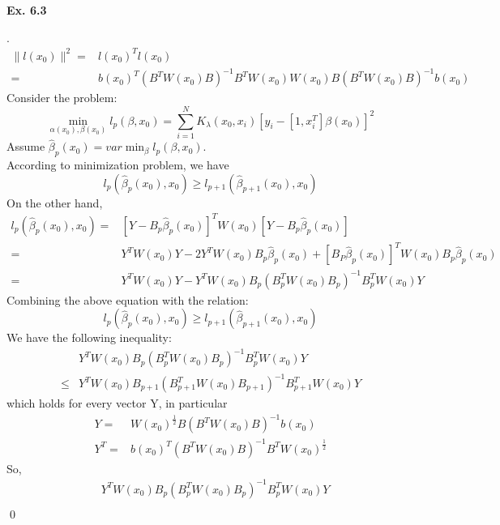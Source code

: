 \documentclass[12pt]{article}
\newenvironment{sol}
  {\par\vspace{3mm}\noindent{\it Solution}.}
  {\qed}
\begin{document}
\newpage
\begin{flushleft}
\textbf{Ex. 6.3}
\end{flushleft}
\begin{sol}
\begin{equation*}
\begin{split}
\parallel l(x_0)\parallel^2=&l(x_0)^Tl(x_0)\\
=&b(x_0)^T(B^TW(x_0)B)^{-1}B^TW(x_0)W(x_0)B(B^TW(x_0)B)^{-1}b(x_0)
\end{split}
\end{equation*}
Consider the problem:
$$\min_{\alpha(x_0),\beta(x_0)}l_p(\beta,x_0)=\sum_{i=1}^NK_{\lambda}(x_0,x_i)[y_i-[1,x_i^T]\beta(x_0)]^2$$
Assume $\hat{\beta}_p(x_0)=var\min_{\beta}l_p(\beta,x_0)$.\\
According to minimization problem, we have
$$l_p(\hat{\beta}_p(x_0),x_0)\geq l_{p+1}(\hat{\beta}_{p+1}(x_0),x_0)$$
On the other hand,
\begin{equation*}
\begin{split}
l_p(\hat{\beta}_p(x_0),x_0)=&[Y-B_p\hat{\beta}_p(x_0)]^TW(x_0)[Y-B_p\hat{\beta}_p(x_0)]\\
=&Y^TW(x_0)Y-2Y^TW(x_0)B_p\hat{\beta}_p(x_0)+[B_P\hat{\beta}_p(x_0)]^TW(x_0)B_p\hat{\beta}_p(x_0)\\
=&Y^TW(x_0)Y-Y^TW(x_0)B_p(B_p^TW(x_0)B_p)^{-1}B_p^TW(x_0)Y
\end{split}
\end{equation*}
Combining the above equation with the relation:
$$l_p(\hat{\beta}_p(x_0),x_0)\geq l_{p+1}(\hat{\beta}_{p+1}(x_0),x_0)$$
We have the following inequality:
\begin{equation*}
\begin{split}
&Y^TW(x_0)B_p(B_p^TW(x_0)B_p)^{-1}B_p^TW(x_0)Y\\
\leq &Y^TW(x_0)B_{p+1}(B_{p+1}^TW(x_0)B_{p+1})^{-1}B_{p+1}^TW(x_0)Y
\end{split}
\end{equation*}
which holds for every vector Y, in particular
\begin{equation*}
\begin{split}
Y=&W(x_0)^{\frac{1}{2}}B(B^TW(x_0)B)^{-1}b(x_0)\\
Y^T=&b(x_0)^T(B^TW(x_0)B)^{-1}B^TW(x_0)^{\frac{1}{2}}
\end{split}
\end{equation*}
So,
\begin{equation*}
\begin{split}
&Y^TW(x_0)B_p(B_p^TW(x_0)B_p)^{-1}B_p^TW(x_0)Y\\

\end{split}
\end{equation*}
\end{sol}
\end{document}
